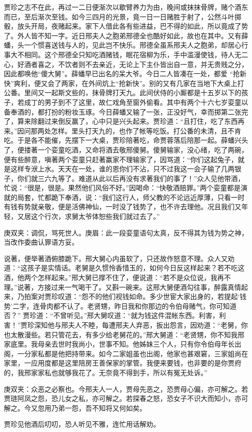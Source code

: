 \begin{parag}
    贾珍之志不在此，再过一二日便渐次以歇臂养力为由，晚间或抹抹骨牌，赌个酒东而已，至后渐次至钱。如今三四月的光景，竟一日一日赌胜于射了，公然斗叶掷骰，放头开局，夜赌起来。家下人借此各有些进益，巴不得的如此，所以竟成了势了。外人皆不知一字。近日邢夫人之胞弟邢德全也酷好如此，故也在其中。又有薛蟠，头一个惯喜送钱与人的，见此岂不快乐。邢德全虽系邢夫人之胞弟，却居心行事大不相同。这个邢德全只知吃酒赌钱，眠花宿柳为乐，手中滥漫使钱，待人无二心，好酒者喜之，不饮者则不去亲近，无论上下主仆皆出自一意，并无贵贱之分，因此都唤他“傻大舅”。薛蟠早已出名的呆大爷。今日二人皆凑在一处，都爱 “抢新快”爽利，便又会了两家，在外间炕上“抢新快”。别的又有几家在当地下大桌上打公番。里间又一起斯文些的，抹骨牌打天九。此间伏侍的小厮都是十五岁以下的孩子，若成丁的男子到不了这里，故仁戏角至窗外偷看。其中有两个十六七岁娈童以备奉酒的，都打扮的粉妆玉琢。今日薛蟠又输了一张，正没好气，幸而掷第二张完了，算来除翻过来倒反赢了，心中只是兴头起来。贾珍道：“且打住，吃了东西再来。”因问那两处怎样。里头打天九的，也作了帐等吃饭。打公番的未清，且不肯吃。于是各不能催，先摆下一大桌，贾珍陪著吃，命贾蓉落后陪那一起。薛蟠兴头了，便搂著一个娈童吃酒，又命将酒去敬邢傻舅。傻舅输家，没心绪，吃了两碗，便有些醉意，嗔著两个娈童只赶著赢家不理输家了，因骂道：“你们这起兔子，就是这样专洑上水。天天在一处，谁的恩你们不沾，只不过我这一会子输了几两银子，你们就三六九等了。难道从此以后再没有求著我们的事了！”众人见他带酒，忙说：“很是，很是。果然他们风俗不好。”因喝命：“快敬酒赔罪。”两个娈童都是演就的局套，忙都跪下奉酒，说：“我们这行人，师父教的不论远近厚薄，只看一时有钱有势就亲敬，便是活佛神仙，一时没了钱势了，也不许去理他。况且我们又年轻，又居这个行次，求舅太爷体恕些我们就过去了。”\begin{note}庚双夹：调侃，骂死世人。庚眉：此一段娈童语句太真，反不得其为钱为势之神，当改作委曲认罪语方妥。\end{note}说著，便举著酒俯膝跪下。邢大舅心内虽软了，只还故作怒意不理。众人又劝道：“这孩子是实情话。老舅是久惯怜香惜玉的，如何今日反这样起来？若不吃这酒，他两个怎样起来。”邢大舅已撑不住了，便说道：“若不是众位说，我再不理。”说著，方接过来一气喝干了。又斟一碗来。这邢大舅便酒勾往事，醉露真情起来，乃拍案对贾珍叹道：“怨不的他们视钱如命。多少世宦大家出身的，若提起‘钱势’二字，连骨肉都不认了。老贤甥，昨日我和你那边的令伯母赌气，你可知道否？” 贾珍道：“不曾听见。”邢大舅叹道：“就为钱这件混帐东西。利害，利害！”贾珍深知他与邢夫人不睦，每遭邢夫人弃恶，扳出怨言，因劝道：“老舅，你也太散漫些。若只管花去，有多少给老舅花的。”邢大舅道：“老贤甥，你不知我邢家底里。我母亲去世时我尚小，世事不知。他姊妹三个人，只有你令伯母年长出阁，一分家私都是他把持带来。如今二家姐虽也出阁，他家也甚艰窘，三家姐尚在家里，一应用度都是这里陪房王善保家的掌管。我便来要钱，也非要的是你贾府的，我邢家家私也就够我花了。无奈竟不得到手，所以有冤无处诉。”\begin{note}庚双夹：众恶之必察也。今邢夫人一人，贾母先恶之，恐贾母心偏，亦可解之。若贾琏阿凤之怨，恐儿女之私，亦可解之。若探春之怒，恐女子不识大而知小，亦可解之。今又忽用乃弟一怨，吾不知将又何如矣。\end{note}贾珍见他酒后叨叨，恐人听见不雅，连忙用话解劝。
\end{parag}


